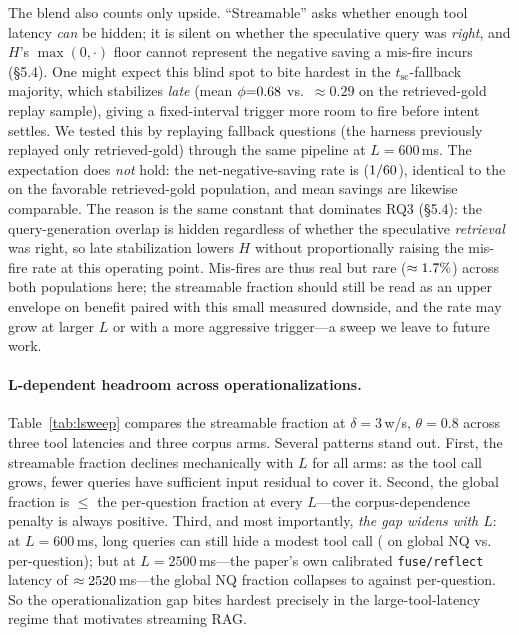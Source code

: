 The blend also counts only upside. ``Streamable'' asks whether enough tool latency
\emph{can} be hidden; it is silent on whether the speculative query was
\emph{right}, and $H$'s $\max(0,\cdot)$ floor cannot represent the negative saving a
mis-fire incurs (\S5.4). One might expect this blind spot to bite hardest in the
$t_{\mathrm{sc}}$-fallback majority, which stabilizes \emph{late}
(mean $\phi{=}0.68{}$ vs.\ $\approx0.29$ on the retrieved-gold replay
sample), giving a fixed-interval trigger more room to fire before intent settles. We
tested this by replaying \rqThreeN{} fallback questions (the harness previously
replayed only retrieved-gold) through the same pipeline at $L{=}600$\,ms. The
expectation does \emph{not} hold: the net-negative-saving rate is \negRateSc{}
($1/60{}$), identical to the \negRateSuf{} on the favorable retrieved-gold
population, and mean savings are likewise comparable. The reason is the same constant
that dominates RQ3 (\S5.4): the query-generation overlap is hidden regardless of
whether the speculative \emph{retrieval} was right, so late stabilization lowers $H$
without proportionally raising the mis-fire rate at this operating point. Mis-fires
are thus real but rare ($\approx1.7\%{}$) across both populations here; the
streamable fraction should still be read as an upper envelope on benefit paired with
this small measured downside, and the rate may grow at larger $L$ or with a more
aggressive trigger---a sweep we leave to future work.

\paragraph{L-dependent headroom across operationalizations.}
Table~\ref{tab:lsweep} compares the streamable fraction at
$\delta{=}3$\,w/s, $\theta{=}0.8$ across three tool latencies and three corpus
arms.  Several patterns stand out.  First, the streamable fraction declines
mechanically with $L$ for all arms: as the tool call grows, fewer queries
have sufficient input residual to cover it.  Second, the global fraction is
$\le$ the per-question fraction at every $L$---the corpus-dependence penalty
is always positive.  Third, and most importantly, \emph{the gap widens with
$L$}: at $L{=}600$\,ms, long queries can still hide a modest tool call
(\sfNqSix{} on global NQ vs.\ \sfPqSix{} per-question); but at
$L{=}2500$\,ms---the paper's own calibrated \texttt{fuse/reflect} latency of
$\approx2520{}$\,ms---the global NQ fraction collapses to \sfNqTwentyfive{}
against \sfPqTwentyfive{} per-question.  So the operationalization gap bites
hardest precisely in the large-tool-latency regime that motivates streaming RAG.


